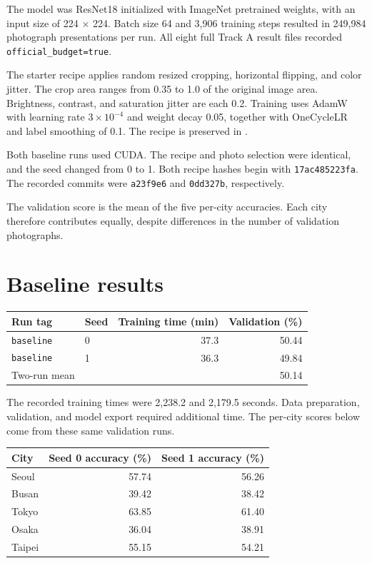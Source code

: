 \documentclass[11pt]{article}
\begin{document}
The model was ResNet18 initialized with ImageNet pretrained weights, with an
input size of 224 $\times$ 224. Batch size 64 and 3,906 training steps resulted
in 249,984 photograph presentations per run. All eight full Track A result files
recorded \texttt{official\_budget=true}.

The starter recipe applies random resized cropping, horizontal flipping, and
color jitter. The crop area ranges from 0.35 to 1.0 of the original image area.
Brightness, contrast, and saturation jitter are each 0.2. Training uses AdamW
with learning rate $3\times10^{-4}$ and weight decay 0.05, together with
OneCycleLR and label smoothing of 0.1. The recipe is preserved in
.

Both baseline runs used CUDA. The recipe and photo selection were identical,
and the seed changed from 0 to 1. Both recipe hashes begin with
\texttt{17ac485223fa}. The recorded commits were \texttt{a23f9e6} and
\texttt{0dd327b}, respectively.

The validation score is the mean of the five per-city accuracies. Each city
therefore contributes equally, despite differences in the number of
validation photographs.

\section{Baseline results}

\begin{center}\small
\begin{tabular}{llrr}
\toprule
Run tag & Seed & Training time (min) & Validation (\%) \\
\midrule
\texttt{baseline} & 0 & 37.3 & 50.44 \\
\texttt{baseline} & 1 & 36.3 & 49.84 \\
\midrule
Two-run mean & & & 50.14 \\
\bottomrule
\end{tabular}
\end{center}

The recorded training times were 2,238.2 and 2,179.5 seconds. Data preparation,
validation, and model export required additional time. The per-city scores
below come from these same validation runs.

\begin{center}\small
\begin{tabular}{lrr}
\toprule
City & Seed 0 accuracy (\%) & Seed 1 accuracy (\%) \\
\midrule
Seoul & 57.74 & 56.26 \\
Busan & 39.42 & 38.42 \\
Tokyo & 63.85 & 61.40 \\
Osaka & 36.04 & 38.91 \\
Taipei & 55.15 & 54.21 \\
\bottomrule
\end{tabular}
\end{center}
\end{document}
